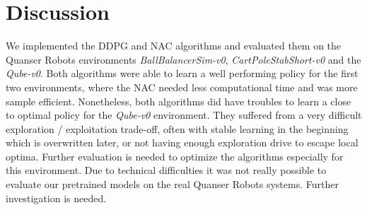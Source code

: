 
\section{Discussion}
\label{sec:discussion}
We implemented the DDPG and NAC algorithms and evaluated them on the Quanser Robots environments \textit{BallBalancerSim-v0}, \textit{CartPoleStabShort-v0} and the \textit{Qube-v0}. Both algorithms were able to learn a well performing policy for the first two environments, where the NAC needed less computational time and was more sample efficient. Nonetheless, both algorithms did have troubles to learn a close to optimal policy for the \textit{Qube-v0} environment. They suffered from a very difficult exploration / exploitation trade-off, often with stable learning in the beginning which is overwritten later, or not having enough exploration drive to escape local optima. Further evaluation is needed to optimize the algorithms especially for this environment. Due to technical difficulties it was not really possible to evaluate our pretrained models on the real Quanser Robots systems. Further investigation is needed.


\newpage 






